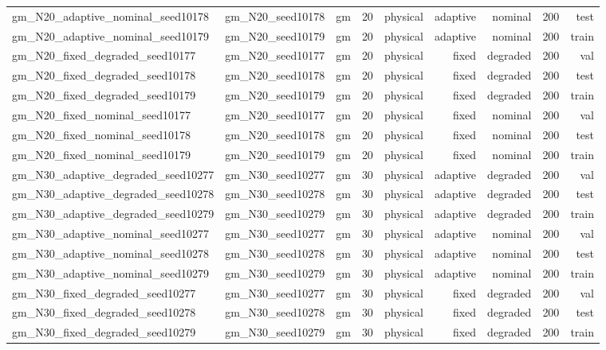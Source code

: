 \begin{tabular}{lrrrrrrrr}
gm\_N20\_adaptive\_nominal\_seed10178 & gm\_N20\_seed10178 & gm & 20 & physical & adaptive & nominal & 200 & test \\
gm\_N20\_adaptive\_nominal\_seed10179 & gm\_N20\_seed10179 & gm & 20 & physical & adaptive & nominal & 200 & train \\
gm\_N20\_fixed\_degraded\_seed10177 & gm\_N20\_seed10177 & gm & 20 & physical & fixed & degraded & 200 & val \\
gm\_N20\_fixed\_degraded\_seed10178 & gm\_N20\_seed10178 & gm & 20 & physical & fixed & degraded & 200 & test \\
gm\_N20\_fixed\_degraded\_seed10179 & gm\_N20\_seed10179 & gm & 20 & physical & fixed & degraded & 200 & train \\
gm\_N20\_fixed\_nominal\_seed10177 & gm\_N20\_seed10177 & gm & 20 & physical & fixed & nominal & 200 & val \\
gm\_N20\_fixed\_nominal\_seed10178 & gm\_N20\_seed10178 & gm & 20 & physical & fixed & nominal & 200 & test \\
gm\_N20\_fixed\_nominal\_seed10179 & gm\_N20\_seed10179 & gm & 20 & physical & fixed & nominal & 200 & train \\
gm\_N30\_adaptive\_degraded\_seed10277 & gm\_N30\_seed10277 & gm & 30 & physical & adaptive & degraded & 200 & val \\
gm\_N30\_adaptive\_degraded\_seed10278 & gm\_N30\_seed10278 & gm & 30 & physical & adaptive & degraded & 200 & test \\
gm\_N30\_adaptive\_degraded\_seed10279 & gm\_N30\_seed10279 & gm & 30 & physical & adaptive & degraded & 200 & train \\
gm\_N30\_adaptive\_nominal\_seed10277 & gm\_N30\_seed10277 & gm & 30 & physical & adaptive & nominal & 200 & val \\
gm\_N30\_adaptive\_nominal\_seed10278 & gm\_N30\_seed10278 & gm & 30 & physical & adaptive & nominal & 200 & test \\
gm\_N30\_adaptive\_nominal\_seed10279 & gm\_N30\_seed10279 & gm & 30 & physical & adaptive & nominal & 200 & train \\
gm\_N30\_fixed\_degraded\_seed10277 & gm\_N30\_seed10277 & gm & 30 & physical & fixed & degraded & 200 & val \\
gm\_N30\_fixed\_degraded\_seed10278 & gm\_N30\_seed10278 & gm & 30 & physical & fixed & degraded & 200 & test \\
gm\_N30\_fixed\_degraded\_seed10279 & gm\_N30\_seed10279 & gm & 30 & physical & fixed & degraded & 200 & train \\

\end{tabular}
